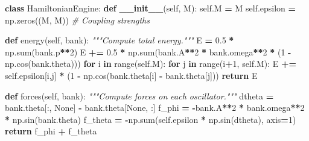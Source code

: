 \documentclass[
  11pt,
  a4paper,
]{article}
\newenvironment{Shaded}{\begin{snugshade}}{\end{snugshade}}
\newcommand{\BuiltInTok}[1]{#1}
\newcommand{\CommentTok}[1]{\textcolor[rgb]{0.56,0.35,0.01}{\textit{#1}}}
\newcommand{\ControlFlowTok}[1]{\textcolor[rgb]{0.13,0.29,0.53}{\textbf{#1}}}
\newcommand{\DecValTok}[1]{\textcolor[rgb]{0.00,0.00,0.81}{#1}}
\newcommand{\FloatTok}[1]{\textcolor[rgb]{0.00,0.00,0.81}{#1}}
\newcommand{\FunctionTok}[1]{\textcolor[rgb]{0.13,0.29,0.53}{\textbf{#1}}}
\newcommand{\KeywordTok}[1]{\textcolor[rgb]{0.13,0.29,0.53}{\textbf{#1}}}
\newcommand{\NormalTok}[1]{#1}
\newcommand{\OperatorTok}[1]{\textcolor[rgb]{0.81,0.36,0.00}{\textbf{#1}}}
\newcommand{\VariableTok}[1]{\textcolor[rgb]{0.00,0.00,0.00}{#1}}
\begin{document}
\begin{Shaded}
\begin{Highlighting}[]
\KeywordTok{class}\NormalTok{ HamiltonianEngine:}
    \KeywordTok{def} \FunctionTok{\_\_init\_\_}\NormalTok{(}\VariableTok{self}\NormalTok{, M):}
        \VariableTok{self}\NormalTok{.M }\OperatorTok{=}\NormalTok{ M}
        \VariableTok{self}\NormalTok{.epsilon }\OperatorTok{=}\NormalTok{ np.zeros((M, M))  }\CommentTok{\# Coupling strengths}
    
    \KeywordTok{def}\NormalTok{ energy(}\VariableTok{self}\NormalTok{, bank):}
        \CommentTok{"""Compute total energy."""}
\NormalTok{        E }\OperatorTok{=} \FloatTok{0.5} \OperatorTok{*}\NormalTok{ np.}\BuiltInTok{sum}\NormalTok{(bank.p}\OperatorTok{**}\DecValTok{2}\NormalTok{)}
\NormalTok{        E }\OperatorTok{+=} \FloatTok{0.5} \OperatorTok{*}\NormalTok{ np.}\BuiltInTok{sum}\NormalTok{(bank.A}\OperatorTok{**}\DecValTok{2} \OperatorTok{*}\NormalTok{ bank.omega}\OperatorTok{**}\DecValTok{2} \OperatorTok{*}\NormalTok{ (}\DecValTok{1} \OperatorTok{{-}}\NormalTok{ np.cos(bank.theta)))}
        \ControlFlowTok{for}\NormalTok{ i }\KeywordTok{in} \BuiltInTok{range}\NormalTok{(}\VariableTok{self}\NormalTok{.M):}
            \ControlFlowTok{for}\NormalTok{ j }\KeywordTok{in} \BuiltInTok{range}\NormalTok{(i}\OperatorTok{+}\DecValTok{1}\NormalTok{, }\VariableTok{self}\NormalTok{.M):}
\NormalTok{                E }\OperatorTok{+=} \VariableTok{self}\NormalTok{.epsilon[i,j] }\OperatorTok{*}\NormalTok{ (}\DecValTok{1} \OperatorTok{{-}}\NormalTok{ np.cos(bank.theta[i] }\OperatorTok{{-}}\NormalTok{ bank.theta[j]))}
        \ControlFlowTok{return}\NormalTok{ E}
    
    \KeywordTok{def}\NormalTok{ forces(}\VariableTok{self}\NormalTok{, bank):}
        \CommentTok{"""Compute forces on each oscillator."""}
\NormalTok{        dtheta }\OperatorTok{=}\NormalTok{ bank.theta[:, }\VariableTok{None}\NormalTok{] }\OperatorTok{{-}}\NormalTok{ bank.theta[}\VariableTok{None}\NormalTok{, :]}
\NormalTok{        f\_phi }\OperatorTok{=} \OperatorTok{{-}}\NormalTok{bank.A}\OperatorTok{**}\DecValTok{2} \OperatorTok{*}\NormalTok{ bank.omega}\OperatorTok{**}\DecValTok{2} \OperatorTok{*}\NormalTok{ np.sin(bank.theta)}
\NormalTok{        f\_theta }\OperatorTok{=} \OperatorTok{{-}}\NormalTok{np.}\BuiltInTok{sum}\NormalTok{(}\VariableTok{self}\NormalTok{.epsilon }\OperatorTok{*}\NormalTok{ np.sin(dtheta), axis}\OperatorTok{=}\DecValTok{1}\NormalTok{)}
        \ControlFlowTok{return}\NormalTok{ f\_phi }\OperatorTok{+}\NormalTok{ f\_theta}
    

\end{Highlighting}
\end{Shaded}
\end{document}
